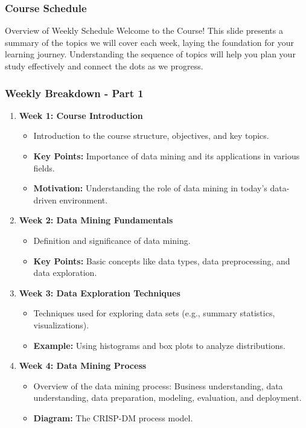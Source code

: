 \documentclass[aspectratio=169]{beamer}
\begin{document}
\begin{frame}[fragile]
    \frametitle{Course Schedule}
    \begin{block}{Overview of Weekly Schedule}
        Welcome to the Course! This slide presents a summary of the topics we will cover each week, laying the foundation for your learning journey. Understanding the sequence of topics will help you plan your study effectively and connect the dots as we progress.
    \end{block}
\end{frame}

\begin{frame}[fragile]
    \frametitle{Weekly Breakdown - Part 1}
    \begin{enumerate}
        \item \textbf{Week 1: Course Introduction}
            \begin{itemize}
                \item Introduction to the course structure, objectives, and key topics.
                \item \textbf{Key Points:} Importance of data mining and its applications in various fields.
                \item \textbf{Motivation:} Understanding the role of data mining in today’s data-driven environment.
            \end{itemize}
        \item \textbf{Week 2: Data Mining Fundamentals}
            \begin{itemize}
                \item Definition and significance of data mining.
                \item \textbf{Key Points:} Basic concepts like data types, data preprocessing, and data exploration.
            \end{itemize}
        \item \textbf{Week 3: Data Exploration Techniques}
            \begin{itemize}
                \item Techniques used for exploring data sets (e.g., summary statistics, visualizations).
                \item \textbf{Example:} Using histograms and box plots to analyze distributions.
            \end{itemize}
        \item \textbf{Week 4: Data Mining Process}
            \begin{itemize}
                \item Overview of the data mining process: Business understanding, data understanding, data preparation, modeling, evaluation, and deployment.
                \item \textbf{Diagram:} The CRISP-DM process model.
            \end{itemize}
    \end{enumerate}
\end{frame}
\end{document}
